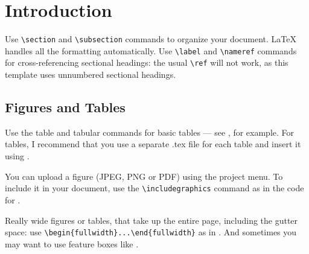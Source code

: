\section{Introduction} \label{intro}
Use \verb|\section| and \verb|\subsection| commands to organize your document. \LaTeX{} handles all the formatting automatically. Use \verb|\label| and \verb|\nameref| commands for cross-referencing sectional headings: the usual \verb|\ref| will not work, as this template uses unnumbered sectional headings. \par
\lipsum[2]

\subsection{Figures and Tables}
Use the table and tabular commands for basic tables --- see , for example. For tables, I recommend that you use a separate .tex file for each table and insert it using \verb||.

You can upload a figure (JPEG, PNG or PDF) using the project menu. To include it in your document, use the \verb|\includegraphics| command as in the code for . 

Really wide figures or tables, that take up the entire page, including the gutter space: use \verb|\begin{fullwidth}...\end{fullwidth}| as in . And sometimes you may want to use feature boxes like .


